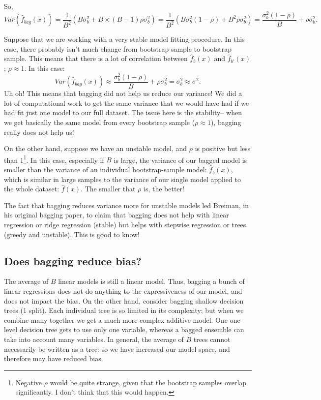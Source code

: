 So, 
$$
Var\left(\hat{f}_{bag}(x)\right) = \frac{1}{B^2} \left(B \sigma_b^2 + B \times (B-1) \rho \sigma_b^2 \right) = \frac{1}{B^2} \left(B \sigma_b^2 (1 - \rho) + B^2 \rho \sigma_b^2  \right)  = \frac{\sigma_b^2 (1 - \rho)}{B} + \rho \sigma_b^2.
$$

Suppose that we are working with a very stable model fitting procedure. In this case, there probably isn't much change from bootstrap sample to bootstrap sample. This means that there is a lot of correlation between $\hat{f}_b(x)$ and $\hat{f}_{b'}(x)$; $\rho \approx 1$. In this case: 
$$
Var\left(\hat{f}_{bag}(x)\right) \approx \frac{\sigma_b^2 (1 - \rho)}{B} + \rho \sigma_b^2 = \sigma_b^2 \approx \sigma^2. 
$$
Uh oh! This means that bagging did not help us reduce our variance! We did a lot of computational work to get the same variance that we would have had if we had fit just one model to our full dataset. The issue here is the stability-- when we get basically the same model from every bootstrap sample ($\rho \approx 1$), bagging really does not help us!

On the other hand, suppose we have an unstable model, and $\rho$ is positive but less than 1\footnote{Negative $\rho$ would be quite strange, given that the bootstrap samples overlap significantly. I don't think that this would happen.}. In this case, especially if $B$ is large, the variance of our bagged model is smaller than the variance of an individual bootstrap-sample model: $\hat{f}_b(x)$, which is similar in large samples to the variance of our single model applied to the whole dataset: $\hat{f}(x)$. The smaller that $\rho$ is, the better! 

The fact that bagging reduces variance more for unstable models led Breiman, in his original bagging paper, to claim that bagging does not help with linear regression or ridge regression (stable) but helps with stepwise regression or trees (greedy and unstable). This is good to know!

\subsection{Does bagging reduce bias?}

The average of $B$ linear models is still a linear model. Thus, bagging a bunch of linear regressions does not do anything to the expressiveness of our model, and does not impact the bias. On the other hand, consider bagging shallow decision trees (1 split). Each individual tree is so limited in its complexity; but when we combine many together we get a much more complex additive model. One one-level decision tree gets to use only one variable, whereas a bagged ensemble can take into account many variables. In general, the average of $B$ trees cannot necessarily be written as a tree: so we have increased our model space, and therefore may have reduced bias.  

